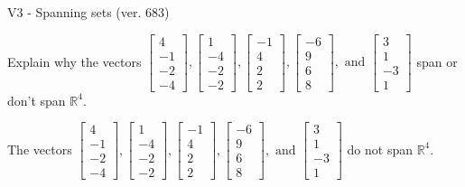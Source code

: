 \begin{exercise}
  \begin{exerciseTitle}V3 - Spanning sets (ver. 683)\end{exerciseTitle}
  \begin{exerciseStatement}
    Explain why the vectors \(\left[\begin{array}{r}
4 \\
-1 \\
-2 \\
-4
\end{array}\right] , \left[\begin{array}{r}
1 \\
-4 \\
-2 \\
-2
\end{array}\right] , \left[\begin{array}{r}
-1 \\
4 \\
2 \\
2
\end{array}\right] , \left[\begin{array}{r}
-6 \\
9 \\
6 \\
8
\end{array}\right] , \text{ and } \left[\begin{array}{r}
3 \\
1 \\
-3 \\
1
\end{array}\right]\) span or don't span \(\mathbb{R}^4\). 
	


  \end{exerciseStatement}
  \begin{exerciseAnswer}
   The vectors \(\left[\begin{array}{r}
4 \\
-1 \\
-2 \\
-4
\end{array}\right] , \left[\begin{array}{r}
1 \\
-4 \\
-2 \\
-2
\end{array}\right] , \left[\begin{array}{r}
-1 \\
4 \\
2 \\
2
\end{array}\right] , \left[\begin{array}{r}
-6 \\
9 \\
6 \\
8
\end{array}\right] , \text{ and } \left[\begin{array}{r}
3 \\
1 \\
-3 \\
1
\end{array}\right]\) 
  	 do not  
	span \(\mathbb{R}^4\).
  



\end{exerciseAnswer}
\end{exercise}
